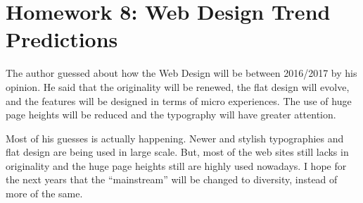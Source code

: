\chapter{Homework 8: Web Design Trend Predictions}
	The author guessed about how the Web Design will be between 2016/2017 by his opinion. He said that the originality will be renewed, the flat design will evolve, and the features will be designed in terms of micro experiences. The use of huge page heights will be reduced and the typography will have greater attention.

	Most of his guesses is actually happening. Newer and stylish typographies and flat design are being used in large scale. But, most of the web sites still lacks in originality and the huge page heights still are highly used nowadays. I hope for the next years that the ``mainstream'' will be changed to diversity, instead of more of the same.
